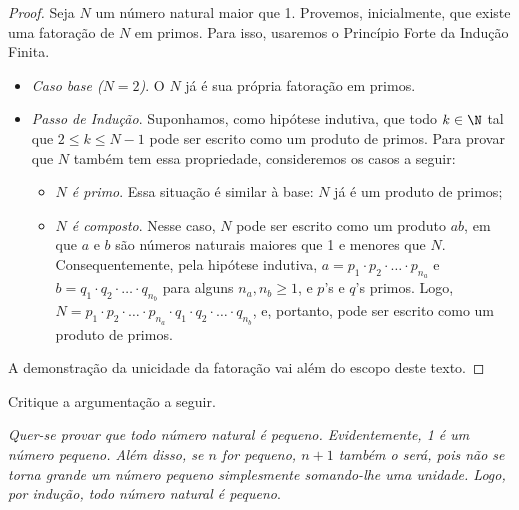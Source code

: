 \begin{proof}
  Seja $N$ um número natural maior que 1. 
  Provemos, inicialmente, que existe uma fatoração de $N$ em primos.
  Para isso, usaremos o Princípio Forte da Indução Finita.

  \begin{itemize}
    \item \emph{Caso base ($N = 2$)}. O $N$ já é sua própria fatoração em primos.
    \item \emph{Passo de Indução}. Suponhamos, como hipótese indutiva, que todo $k \in \N$ tal que $2 \le k \le N-1$ pode ser escrito como um produto de primos.
    Para provar que $N$ também tem essa propriedade, consideremos os casos a seguir:

    \begin{itemize}
      \item \emph{$N$ é primo}. Essa situação é similar à base: $N$ já é um produto de primos;
      \item \emph{$N$ é composto}. Nesse caso, $N$ pode ser escrito como um produto $ab$, em que $a$ e $b$ são números naturais maiores que 1 e menores que $N$.
      Consequentemente, pela hipótese indutiva, $a = p_1 \cdot p_2 \cdot \ldots \cdot p_{n_a}$ e $b = q_1 \cdot q_2 \cdot \ldots \cdot q_{n_b}$ para alguns $n_a, n_b \ge 1$, e $p$'s e $q$'s primos.
      Logo, $N = p_1 \cdot p_2 \cdot \ldots \cdot p_{n_a} \cdot q_1 \cdot q_2 \cdot \ldots \cdot q_{n_b}$, e, portanto, pode ser escrito como um produto de primos.
     \end{itemize}
  \end{itemize}
  
  A demonstração da unicidade da fatoração vai além do escopo deste texto. 

\end{proof}

\begin{example}
Critique a argumentação a seguir.

\textit{Quer-se provar que todo número natural é pequeno. Evidentemente, 1 é um número pequeno. Além disso, se $n$ for pequeno, $n+1$ também o será, pois não se torna grande um número pequeno simplesmente somando-lhe uma unidade. Logo, por indução, todo número natural é pequeno}.
\end{example}

